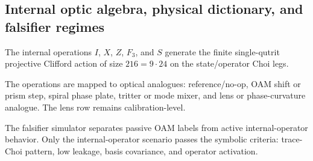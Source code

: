 \subsection{Internal optic algebra, physical dictionary, and falsifier regimes}
\label{sec:bt1567-bt1569-internal-operator-falsifier}

The internal operations $I$, $X$, $Z$, $F_3$, and $S$ generate the finite single-qutrit projective Clifford action of size $216=9\cdot24$ on the state/operator Choi legs.

The operations are mapped to optical analogues: reference/no-op, OAM shift or prism step, spiral phase plate, tritter or mode mixer, and lens or phase-curvature analogue.  The lens row remains calibration-level.

The falsifier simulator separates passive OAM labels from active internal-operator behavior.  Only the internal-operator scenario passes the symbolic criteria: trace-Choi pattern, low leakage, basis covariance, and operator activation.
